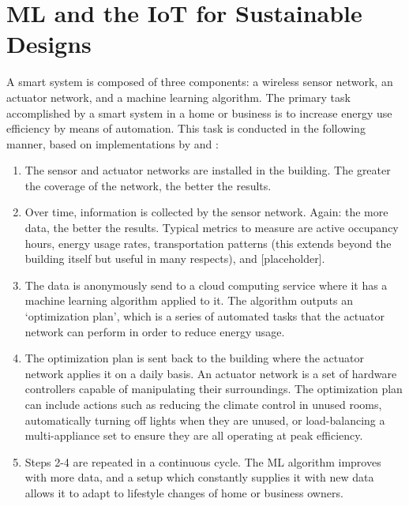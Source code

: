 \documentclass[letterpaper]{article}
\begin{document}
\section{ML and the IoT for Sustainable Designs} \label{main}
A smart system is composed of three components: a wireless sensor network, an actuator network, and a machine learning algorithm. The primary task accomplished by a smart system in a home or business is to increase energy use efficiency by means of automation. This task is conducted in the following manner, based on implementations by \textcite{pang15} and \textcite{risteska17}:

\begin{center}
\begin{enumerate}
\item
    The sensor and actuator networks are installed in the building. The greater the coverage of the network, the better the results.
\item
    Over time, information is collected by the sensor network. Again: the more data, the better the results. Typical metrics to measure are active occupancy hours, energy usage rates, transportation patterns (this extends beyond the building itself but useful in many respects), and [placeholder].
\item
    The data is anonymously send to a cloud computing service where it has a machine learning algorithm applied to it. The algorithm outputs an `optimization plan', which is a series of automated tasks that the actuator network can perform in order to reduce energy usage.
\item
    The optimization plan is sent back to the building where the actuator network applies it on a daily basis. An actuator network is a set of hardware controllers capable of manipulating their surroundings. The optimization plan can include actions such as reducing the climate control in unused rooms, automatically turning off lights when they are unused, or load-balancing a multi-appliance set to ensure they are all operating at peak efficiency.
\item
    Steps 2-4 are repeated in a continuous cycle. The ML algorithm improves with more data, and a setup which constantly supplies it with new data allows it to adapt to lifestyle changes of home or business owners.
\end{enumerate}
\end{center}
\end{document}
